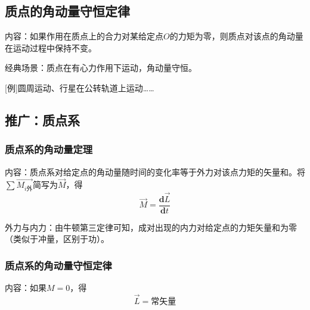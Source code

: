 \subsection{质点的角动量守恒定律}
内容：如果作用在质点上的合力对某给定点$O$的力矩为零，则质点对该点的角动量在运动过程中保持不变。

经典场景：质点在有心力作用下运动，角动量守恒。

[例]圆周运动、行星在公转轨道上运动……

\subsection{推广：质点系}
\subsubsection{质点系的角动量定理}
内容：质点系对给定点的角动量随时间的变化率等于外力对该点力矩的矢量和。将$\sum\vec{M_{i\text{外}}}$简写为$\vec{M}$，得
$$\vec{M}=\frac{\mathbf{d}\vec{L}}{\mathbf{d}t}$$

外力与内力：由牛顿第三定律可知，成对出现的内力对给定点的力矩矢量和为零
（类似于冲量，区别于功）。

\subsubsection{质点系的角动量守恒定律}
内容：如果$M=0$，得
$$\vec{L}=\text{常矢量}$$

